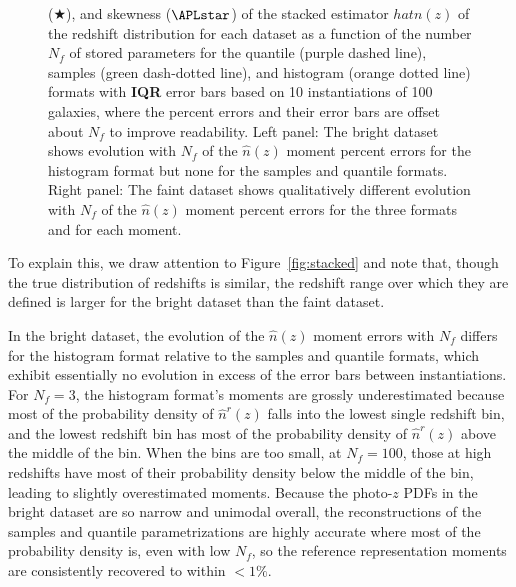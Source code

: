 \documentclass[\docopts]{\docclass}
\newcommand{\pz}{photo-$z$ PDF}
\newcommand{\mgdata}{bright\xspace}
\newcommand{\ssdata}{faint\xspace}
\begin{document}
\begin{figure}
\begin{center}
{($\bigstar$), and skewness ($\APLstar$) of the stacked estimator $hat{n}(z)$ of 
the redshift distribution for each dataset as a function of the number $N_{f}$ 
of stored parameters for the quantile (purple dashed line), samples (green 
dash-dotted line), and histogram (orange dotted line) formats with \textbf{IQR} 
error bars based on 10 instantiations of 100 galaxies, where the percent errors 
and their error bars are offset about $N_{f}$ to improve readability.
    Left panel: The \mgdata dataset shows evolution with $N_{f}$ of the 
$\hat{n}(z)$ moment percent errors for the histogram format but none for the 
samples and quantile formats.
    Right panel: The \ssdata dataset shows qualitatively different evolution 
with $N_{f}$ of the $\hat{n}(z)$ moment percent errors for the three formats 
and for each moment.
    \label{fig:nz_moment_errs}}
  \end{center}
\end{figure}
To explain this, we draw attention to Figure~\ref{fig:stacked} and note that, 
though the true distribution of redshifts is similar, the redshift range over 
which they are defined is larger for the \mgdata dataset than the \ssdata 
dataset.

In the \mgdata dataset, the evolution of the $\hat{n}(z)$ moment errors with 
$N_{f}$ differs for the histogram format relative to the samples and quantile 
formats, which exhibit essentially no evolution in excess of the error bars 
between instantiations.
For $N_{f}=3$, the histogram format's moments are grossly underestimated 
because most of the probability density of $\hat{n}^{r}(z)$ falls into the 
lowest single redshift bin, and the lowest redshift bin has most of the 
probability density of $\hat{n}^{r}(z)$ above the middle of the bin.
When the bins are too small, at $N_{f}=100$, those at high redshifts have most 
of their probability density below the middle of the bin, leading to slightly 
overestimated moments.
Because the \pz s in the \mgdata dataset are so narrow and unimodal overall, 
the reconstructions of the samples and quantile parametrizations are highly 
accurate where most of the probability density is, even with low $N_{f}$, so 
the reference representation moments are consistently recovered to within 
$<1\%$.
\end{document}
